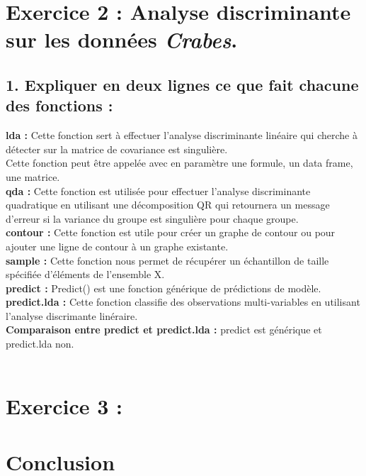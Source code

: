 \documentclass[a4paper, 10pt]{article}
\begin{document}
\section*{Exercice 2 : Analyse discriminante sur les données \textit{Crabes}.}

\subsection*{1. Expliquer en deux lignes ce que fait chacune des fonctions :}
\textbf{lda :} Cette fonction sert à effectuer l'analyse discriminante linéaire qui cherche à détecter sur la matrice de covariance est singulière.\\
Cette fonction peut être appelée avec en paramètre une formule, un data frame, une matrice.\\
\textbf{qda :} Cette fonction est utilisée pour effectuer l'analyse discriminante quadratique en utilisant une décomposition QR qui retournera un message d'erreur si la variance du groupe est singulière pour chaque groupe.\\
\textbf{contour :} Cette fonction est utile pour créer un graphe de contour ou pour ajouter une ligne de contour à un graphe existante.\\
\textbf{sample :} Cette fonction nous permet de récupérer un échantillon de taille spécifiée d'éléments de l'ensemble X.\\
\textbf{predict :} Predict() est une fonction générique de prédictions de modèle.\\
\textbf{predict.lda :} Cette fonction classifie des observations multi-variables en utilisant l'analyse discrimante linéraire.\\
\textbf{Comparaison entre predict et predict.lda :} predict est générique et predict.lda non.\\ \\
\subsection*{}
\subsection*{}
\subsection*{}

\section*{Exercice 3 : }

\subsection*{}
\subsection*{}
\subsection*{}

\section*{Conclusion}
\end{document}
